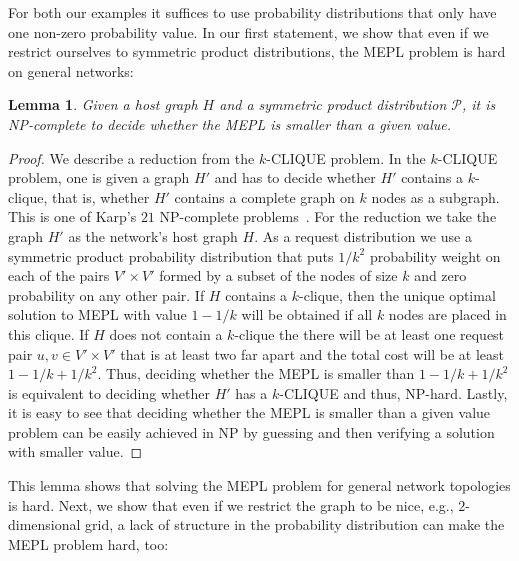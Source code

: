 \documentclass[conference]{IEEEtran}
\def\Pc{\mathcal{P}}
\newtheorem{lemma}{Lemma}
\begin{document}
For both our examples it suffices to use probability distributions that only have one non-zero probability value. In our first statement, we show that even if we restrict ourselves to symmetric product distributions, the MEPL problem is hard on general networks:

\begin{lemma}
Given a host graph $H$ and a symmetric product distribution $\Pc$, it is NP-complete to decide whether the MEPL is smaller than a given value.  
\end{lemma}
\begin{proof}
We describe a reduction from the $k$-CLIQUE problem. In the $k$-CLIQUE problem, one is given a graph $H'$ and has to decide whether $H'$ contains a $k$-clique, that is, whether $H'$ contains a complete graph on $k$ nodes as a subgraph. This is one of Karp's $21$ NP-complete problems~\cite{karp1972reducibility}. For the reduction we take the graph $H'$ as the network's host graph $H$. As a request distribution we use a symmetric product probability distribution that puts $1/k^{2}$ probability weight on each of the pairs $V' \times V'$ formed by a subset of the nodes of size $k$ and zero probability on any other pair. If $H$ contains a $k$-clique, then the unique optimal solution to MEPL with value $1 - 1/k$ will be obtained if all $k$ nodes are placed in this clique. If $H$ does not contain a $k$-clique the there will be at least one request pair $u,v \in V'\times V'$ that is at least two far apart and the total cost will be at least $1 - 1/k + 1/k^2$. Thus, deciding whether the MEPL is smaller than $1 - 1/k + 1/k^2$ is equivalent to deciding whether $H'$ has a $k$-CLIQUE and thus, NP-hard. Lastly, it is easy to see that deciding whether the MEPL is smaller than a given value problem can be easily achieved in NP by guessing and then verifying a solution with smaller value.  
\end{proof}

This lemma shows that solving the MEPL problem for general network topologies is hard. Next, we show that even if we restrict the graph to be nice, e.g., $2$-dimensional grid, a lack of structure in the probability distribution can make the MEPL problem hard, too:
\end{document}
